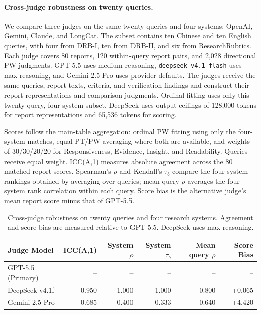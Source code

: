 \documentclass{article}
\begin{document}
\paragraph{Cross-judge robustness on twenty queries.}
We compare three judges on the same twenty queries and four systems: OpenAI, Gemini, Claude, and LongCat. The subset contains ten Chinese and ten English queries, with four from DRB-I, ten from DRB-II, and six from ResearchRubrics. Each judge covers 80 reports, 120 within-query report pairs, and 2,028 directional PW judgments. GPT-5.5 uses medium reasoning, \texttt{deepseek-v4.1-flash} uses max reasoning, and Gemini 2.5 Pro uses provider defaults. The judges receive the same queries, report texts, criteria, and verification findings and construct their report representations and comparison judgments. Ordinal fitting uses only this twenty-query, four-system subset. DeepSeek uses output ceilings of 128,000 tokens for report representations and 65,536 tokens for scoring.

Scores follow the main-table aggregation: ordinal PW fitting using only the four-system matches, equal PT/PW averaging where both are available, and weights of 30/30/20/20 for Responsiveness, Evidence, Insight, and Readability. Queries receive equal weight. ICC(A,1) measures absolute agreement across the 80 matched report scores. Spearman's $\rho$ and Kendall's $\tau_b$ compare the four-system rankings obtained by averaging over queries; mean query $\rho$ averages the four-system rank correlation within each query. Score bias is the alternative judge's mean report score minus that of GPT-5.5.

\begin{table}[t]
\centering
\small
\setlength{\tabcolsep}{5pt}
\begin{tabular}{@{}lrrrrr@{}}
\toprule
Judge Model & ICC(A,1) & System $\rho$ & System $\tau_b$ & Mean query $\rho$ & Score Bias \\
\midrule
GPT-5.5 (Primary) & -- & -- & -- & -- & -- \\
DeepSeek-v4.1f & 0.950 & 1.000 & 1.000 & 0.800 & +0.065 \\
Gemini 2.5 Pro & 0.685 & 0.400 & 0.333 & 0.640 & +4.420 \\
\bottomrule
\end{tabular}
\caption{Cross-judge robustness on twenty queries and four research systems. Agreement and score bias are measured relative to GPT-5.5. DeepSeek uses max reasoning.}
\label{tab:cross-judge-robustness}
\end{table}
\end{document}
